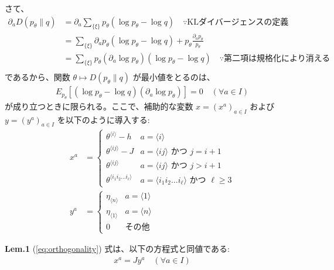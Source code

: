 \documentclass[a4paper,11pt]{jsarticle}
\numberwithin{equation}{section}
\begin{document}
さて、
\begin{align}
\partial_a D(p_\theta \| q) &= \partial_a \sum_{\{ \xi \}} p_\theta \left( \log p_\theta - \log q \right) \quad \because \text{KLダイバージェンスの定義}\\
&= \sum_{\{ \xi \}} \partial_a p_\theta \left( \log p_\theta - \log q \right) + p_\theta \frac{\partial_a p_\theta}{p_\theta} \\
&= \sum_{\{ \xi \}} p_\theta \left( \partial_a \log p_\theta \right) \left( \log p_\theta - \log q \right) \quad \because \text{第二項は規格化により消える}\\
\end{align}
であるから、関数 $\theta \mapsto D(p_\theta \| q)$ が最小値をとるのは、
\begin{align}
E_{p_\theta} \left[ (\log p_\theta - \log q) \left( \partial_a \log p_\theta \right) \right] = 0 \quad (\forall a \in I) \label{eq:orthogonality}
\end{align}
が成り立つときに限られる。ここで、補助的な変数 $x = (x^a)_{a \in I}$ および $y = (y^a)_{a \in I}$ を以下のように導入する:
\begin{align}
    x^a &= 
\begin{cases}
\theta^{\langle i \rangle} - h & a = \langle i \rangle \\
\theta^{\langle ij \rangle} - J & a = \langle ij \rangle \text{ かつ  } j = i + 1 \\
\theta^{\langle ij \rangle} & a = \langle ij \rangle \text{ かつ  } j > i + 1 \\
\theta^{\langle i_1 i_2 \dots i_\ell \rangle} & a = \langle i_1 i_2 \dots i_\ell \rangle \text{ かつ  } \ell \geq 3
\end{cases}\\
y^a &= 
\begin{cases}
\eta_{\langle n \rangle} & a = \langle 1 \rangle \\
\eta_{\langle 1 \rangle} & a = \langle n \rangle \\
0 & その他
\end{cases}
\end{align}

\begin{itembox}[l]{\textbf{Lem.1}}
    (\ref{eq:orthogonality}) 式は、以下の方程式と同値である:
\begin{align}
    x^a = Jy^a \quad (\forall a \in I)
\end{align}
\end{itembox}
\end{document}
